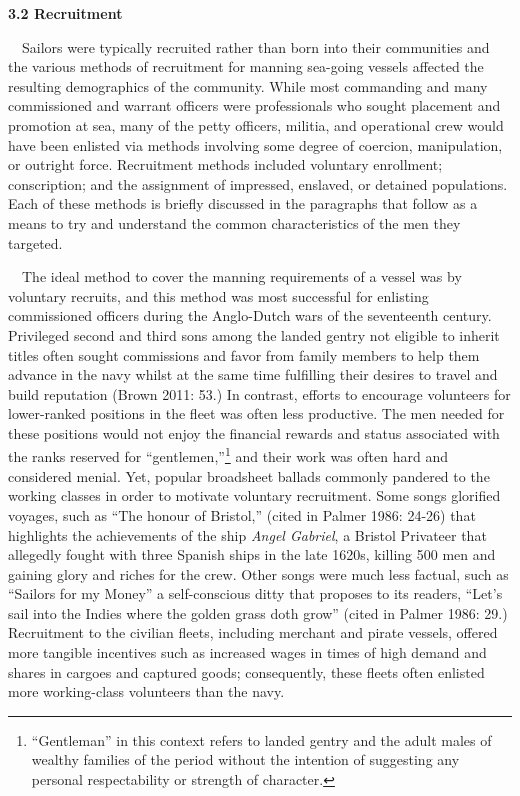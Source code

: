 \begin{styleStandard}
\textbf{3.2 Recruitment}
\end{styleStandard}

\begin{styleStandard}
\ \ Sailors were typically recruited rather than born into their communities and the various methods of recruitment for manning sea-going vessels affected the resulting demographics of the community. While most commanding and many commissioned and warrant officers were professionals who sought placement and promotion at sea, many of the petty officers, militia, and operational crew would have been enlisted via methods involving some degree of coercion, manipulation, or outright force. Recruitment methods included voluntary enrollment; conscription; and the assignment of impressed, enslaved, or detained populations. Each of these methods is briefly discussed in the paragraphs that follow as a means to try and understand the common characteristics of the men they targeted. 
\end{styleStandard}

\begin{styleStandard}
\ \ The ideal method to cover the manning requirements of a vessel was by voluntary recruits, and this method was most successful for enlisting commissioned officers during the Anglo-Dutch wars of the seventeenth century. Privileged second and third sons among the landed gentry not eligible to inherit titles often sought commissions and favor from family members to help them advance in the navy whilst at the same time fulfilling their desires to travel and build reputation (Brown 2011: 53.) In contrast, efforts to encourage volunteers for lower-ranked positions in the fleet was often less productive. The men needed for these positions would not enjoy the financial rewards and status associated with the ranks reserved for “gentlemen,”\footnote{ “Gentleman” in this context refers to landed gentry and the adult males of wealthy families of the period without the intention of suggesting any personal respectability or strength of character. } and their work was often hard and considered menial. Yet, popular broadsheet ballads commonly pandered to the working classes in order to motivate voluntary recruitment. Some songs glorified voyages, such as “The honour of Bristol,” (cited in Palmer 1986: 24-26) that highlights the achievements of the ship \textit{Angel Gabriel}, a Bristol Privateer that allegedly fought with three Spanish ships in the late 1620s, killing 500 men and gaining glory and riches for the crew. Other songs were much less factual, such as “Sailors for my Money” a self-conscious ditty that proposes to its readers, “Let’s sail into the Indies where the golden grass doth grow” (cited in Palmer 1986: 29.) Recruitment to the civilian fleets, including merchant and pirate vessels, offered more tangible incentives such as increased wages in times of high demand and shares in cargoes and captured goods; consequently, these fleets often enlisted more working-class volunteers than the navy. 
\end{styleStandard}

